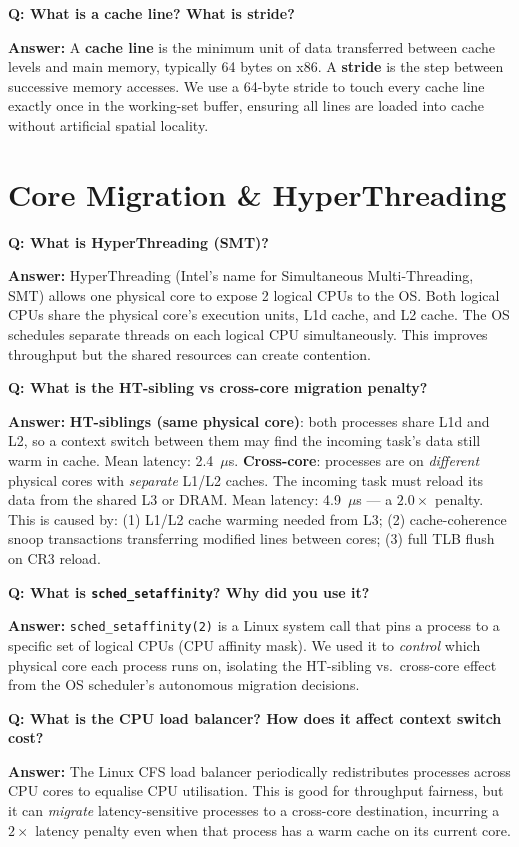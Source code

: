 \documentclass[12pt,a4paper]{article}
\newcommand{\Q}[1]{\begin{mdframed}[style=qbox]
\textbf{\textcolor{qcol}{Q: #1}}\end{mdframed}\vspace{2pt}}
\newcommand{\A}[1]{\begin{mdframed}[style=abox]
\textbf{\textcolor{acol}{Answer:}} #1\end{mdframed}\vspace{10pt}}
\begin{document}
\Q{What is a cache line? What is stride?}
\A{A \textbf{cache line} is the minimum unit of data transferred between cache levels and main memory, typically 64 bytes on x86. A \textbf{stride} is the step between successive memory accesses. We use a 64-byte stride to touch every cache line exactly once in the working-set buffer, ensuring all lines are loaded into cache without artificial spatial locality.}

\section{Core Migration \& HyperThreading}

\Q{What is HyperThreading (SMT)?}
\A{HyperThreading (Intel's name for Simultaneous Multi-Threading, SMT) allows one physical core to expose 2 logical CPUs to the OS. Both logical CPUs share the physical core's execution units, L1d cache, and L2 cache. The OS schedules separate threads on each logical CPU simultaneously. This improves throughput but the shared resources can create contention.}

\Q{What is the HT-sibling vs cross-core migration penalty?}
\A{\textbf{HT-siblings (same physical core)}: both processes share L1d and L2, so a context switch between them may find the incoming task's data still warm in cache. Mean latency: 2.4~$\mu$s.\newline
\textbf{Cross-core}: processes are on \textit{different} physical cores with \textit{separate} L1/L2 caches. The incoming task must reload its data from the shared L3 or DRAM. Mean latency: 4.9~$\mu$s --- a $\mathbf{2.0\times}$ penalty.\newline
This is caused by: (1) L1/L2 cache warming needed from L3; (2) cache-coherence snoop transactions transferring modified lines between cores; (3) full TLB flush on CR3 reload.}

\Q{What is \texttt{sched\_setaffinity}? Why did you use it?}
\A{\texttt{sched\_setaffinity(2)} is a Linux system call that pins a process to a specific set of logical CPUs (CPU affinity mask). We used it to \textit{control} which physical core each process runs on, isolating the HT-sibling vs.\ cross-core effect from the OS scheduler's autonomous migration decisions.}

\Q{What is the CPU load balancer? How does it affect context switch cost?}
\A{The Linux CFS load balancer periodically redistributes processes across CPU cores to equalise CPU utilisation. This is good for throughput fairness, but it can \textit{migrate} latency-sensitive processes to a cross-core destination, incurring a $2\times$ latency penalty even when that process has a warm cache on its current core.}
\end{document}
